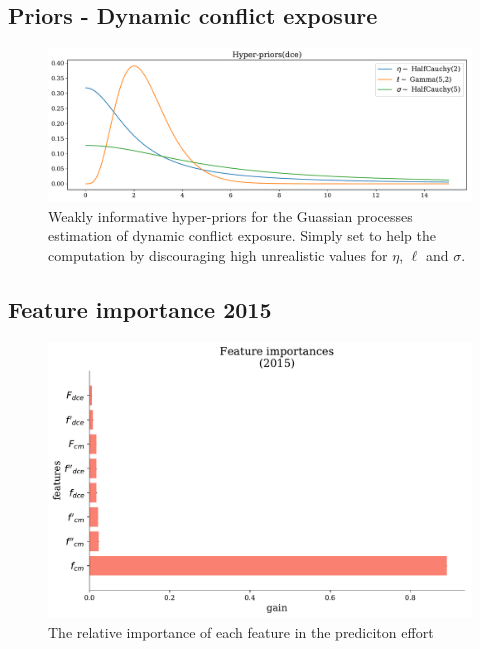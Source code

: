 \documentclass[a4paper]{article}
\begin{document}
\subsection{Priors - Dynamic conflict exposure}\label{dcePrior}

\begin{figure}[!htb]
	\centering
	\includegraphics[scale=0.47]{Hyper-priors(dce).pdf}
    \caption{\footnotesize{Weakly informative hyper-priors for the Guassian processes estimation of dynamic conflict exposure. Simply set to help the computation by discouraging high unrealistic values for $\eta$, $\ell$ and $\sigma$.}}
\end{figure}
\pagebreak

\subsection{Feature importance 2015}\label{feature_imp2015}


\begin{figure}[!htb]
 	\centering
	\includegraphics[scale=0.47]{feature_imp_2015.pdf}
  \caption{\footnotesize{The relative importance of each feature in the prediciton effort}}
\end{figure}
\pagebreak
\end{document}

